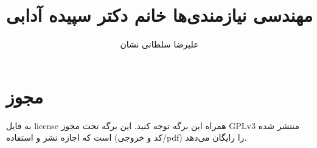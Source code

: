 \documentclass[a4paper]{article}
\title{مهندسی نیازمندی‌ها خانم دکتر سپیده آدابی}
\author{علیرضا سلطانی نشان}
\begin{document}
\maketitle
\tableofcontents

\section*{مجوز}

به فایل license همراه این برگه توجه کنید. این برگه تحت مجوز GPLv3 منتشر شده است
که اجازه نشر و استفاده (کد و خروجی/pdf) را رایگان می‌دهد.








% 
% 
\end{document}
